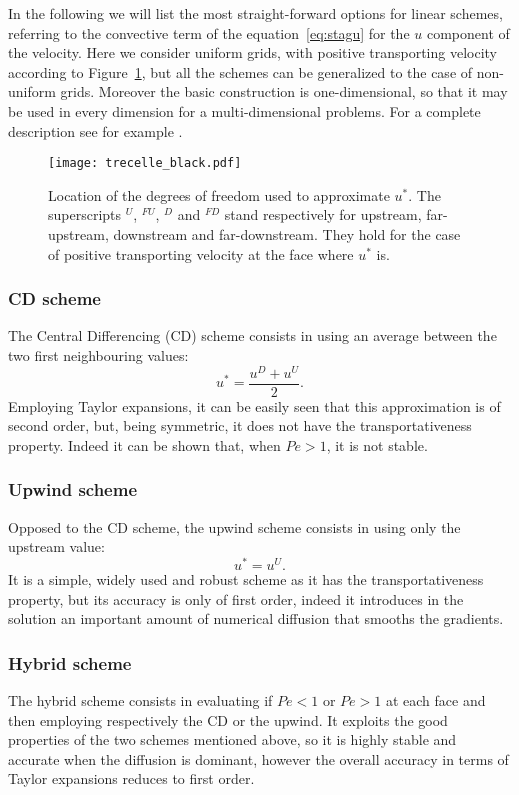 In the following we will list the most straight-forward options for linear schemes, 
referring to the 
convective term of the equation~\eqref{eq:stagu} for the $u$ component of the 
velocity. Here we consider uniform grids, with positive 
transporting velocity according to 
Figure~\ref{fig:superscripts}, but all the schemes can be generalized to the 
case of non-uniform grids. Moreover the basic construction is one-dimensional, 
so that it may be used in every dimension for a multi-dimensional problems. For 
a complete description see for example \cite{main:vermal}.
\begin{figure}
	\centering
	\texttt{[image: trecelle\_black.pdf]}
	\caption[Location of the degrees of freedom used to approximate 
	$u^*$]{Location of the degrees of freedom used to approximate $u^*$. The 
	superscripts $^U$, $^{FU}$, $^D$ and $^{FD}$ stand respectively for 
	upstream, far-upstream, downstream and far-downstream. They hold for the 
	case of positive transporting velocity at the face where $u^*$ is.}
	\label{fig:superscripts}
\end{figure}
\subsubsection{CD scheme}
The Central Differencing (CD) scheme consists in using an average between the 
two first neighbouring values:
\begin{equation} \label{eq:cd}
	u^* = \frac{u^D + u^U}{2}.
\end{equation}
Employing Taylor expansions, it can be easily seen that this approximation is 
of second order, but, being symmetric, it does not have the transportativeness 
property. Indeed it can be shown that, when $Pe > 1$, it is not stable.
%
\subsubsection{Upwind scheme}
Opposed to the CD scheme, the upwind scheme consists in using only the 
upstream value:
\begin{equation} \label{eq:upwind}
	u^* = u^U.
\end{equation}
It is a simple, widely used and robust scheme as it has the transportativeness 
property, but its accuracy is only of first order, indeed it introduces in the 
solution an important amount of numerical diffusion that smooths the gradients. 
%
\subsubsection{Hybrid scheme}
The hybrid scheme \cite{diff:hybrid} consists in evaluating if $Pe<1$ or 
$Pe>1$ at each face and then employing respectively the CD or the upwind. It 
exploits the good properties of the two schemes mentioned above, so it is 
highly stable and accurate when the diffusion is dominant, however the overall 
accuracy in terms of Taylor expansions reduces to first order.
%

